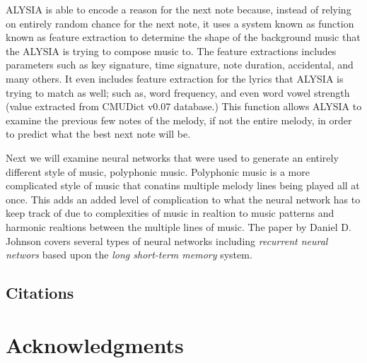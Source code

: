 \documentclass{sig-alternate}
\begin{document}
	ALYSIA is able to encode a reason for the next note because, instead of relying on entirely random chance for the next note, it uses a system known as function known as feature extraction to determine the shape of the background music that the ALYSIA is trying to compose music to. The feature extractions includes parameters such as key signature, time signature, note duration, accidental, and many others. It even includes feature extraction for the lyrics that ALYSIA is trying to match as well; such as, word frequency, and even word vowel strength (value extracted from CMUDict v0.07 database.) This function allows ALYSIA to examine the previous few notes of the melody, if not the entire melody, in order to predict what the best next note will be.

	Next we will examine neural networks that were used to generate an entirely different style of music, polyphonic music. Polyphonic music is a more complicated style of music that conatins multiple melody lines being played all at once. This adds an added level of complication to what the neural network has to keep track of due to complexities of music in realtion to music patterns and harmonic realtions between the multiple lines of music. The paper by Daniel D. Johnson covers several types of neural networks including \textit{recurrent neural networs} based upon the \textit{long short-term memory} system. 
	
	

\label{sec:methodsandmusic}
\subsection{Citations}
\label{sec:citations}

\subsection{}
\label{sec:theoremLikeConstructs}


\subsection*{}
\label{sec:caveatForExperts}



\section*{Acknowledgments}
\label{sec:acknowledgments}



  
\end{document}
